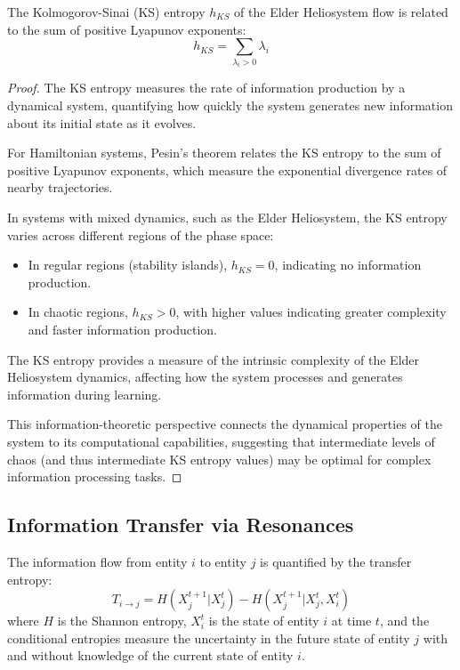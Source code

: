 \begin{theorem}
The Kolmogorov-Sinai (KS) entropy $h_{KS}$ of the Elder Heliosystem flow is related to the sum of positive Lyapunov exponents:
\begin{equation}
h_{KS} = \sum_{\lambda_i > 0} \lambda_i
\end{equation}
\end{theorem}

\begin{proof}
The KS entropy measures the rate of information production by a dynamical system, quantifying how quickly the system generates new information about its initial state as it evolves.

For Hamiltonian systems, Pesin's theorem relates the KS entropy to the sum of positive Lyapunov exponents, which measure the exponential divergence rates of nearby trajectories.

In systems with mixed dynamics, such as the Elder Heliosystem, the KS entropy varies across different regions of the phase space:
\begin{itemize}
    \item In regular regions (stability islands), $h_{KS} = 0$, indicating no information production.
    \item In chaotic regions, $h_{KS} > 0$, with higher values indicating greater complexity and faster information production.
\end{itemize}

The KS entropy provides a measure of the intrinsic complexity of the Elder Heliosystem dynamics, affecting how the system processes and generates information during learning.

This information-theoretic perspective connects the dynamical properties of the system to its computational capabilities, suggesting that intermediate levels of chaos (and thus intermediate KS entropy values) may be optimal for complex information processing tasks.
\end{proof}

\subsection{Information Transfer via Resonances}

\begin{definition}
The information flow from entity $i$ to entity $j$ is quantified by the transfer entropy:
\begin{equation}
T_{i \to j} = H(X_j^{t+1} | X_j^t) - H(X_j^{t+1} | X_j^t, X_i^t)
\end{equation}
where $H$ is the Shannon entropy, $X_i^t$ is the state of entity $i$ at time $t$, and the conditional entropies measure the uncertainty in the future state of entity $j$ with and without knowledge of the current state of entity $i$.
\end{definition}

